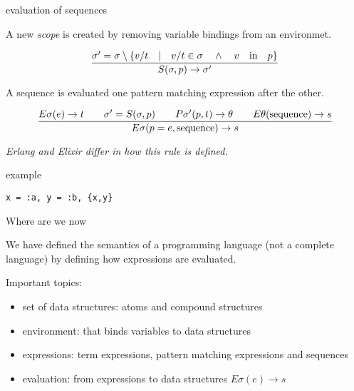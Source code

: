 \begin{frame}{evaluation of sequences}

  \pause  A new {\em scope} is created by removing variable bindings from an environmet.

  \vspace{10pt}\pause

$$\frac{\sigma' = \sigma \setminus \lbrace v/t \quad | \quad v/t \in \sigma \quad \wedge \quad  v \quad {\rm in} \quad p\rbrace}{S(\sigma, p) \rightarrow \sigma'}$$
  
\vspace{10pt}\pause

A sequence is evaluated one pattern matching expression after the other. 

$$\frac{   
  E\sigma(e) \rightarrow t
  \qquad \sigma' = S(\sigma, p)
  \qquad P\sigma'(p, t) \rightarrow \theta
  \qquad E\theta({\rm sequence}) \rightarrow s
}{E\sigma(p = e, {\rm sequence}) \rightarrow s}$$ 

\vfill
{\em Erlang and Elixir differ in how this rule is defined.}
\end{frame}

\begin{frame}{example}

   {\tt x = :a, y = :b, \{x,y\}}

\end{frame}

\begin{frame}{Where are we now}

We have defined the semantics of a programming language (not a
complete language) by defining how expressions are evaluated.

\vspace{20pt} 

\pause Important topics:

\vspace{10pt} 

\begin{itemize}
 \pause \item set of data structures: atoms and compound structures
 \pause \item environment: that binds variables to data structures
 \pause \item expressions: term expressions, pattern matching expressions and sequences
 \pause \item evaluation: from expressions to data structures $E\sigma(e) \rightarrow s$
\end{itemize}

\end{frame}

